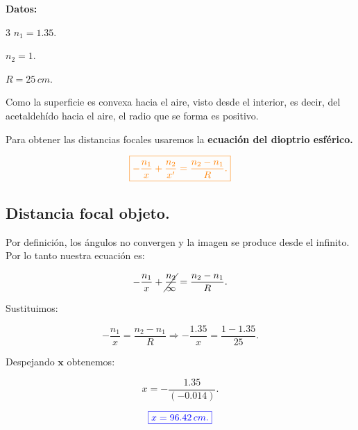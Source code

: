 \documentclass[a4paper,12pt]{article} %
\begin{document}
\vspace{\baselineskip}

\begin{justify}
	\textbf{Datos:}
\end{justify}

\begin{multicols}{3}
	\(n_1 = 1.35.\)

	\(n_2 = 1.\)

	\(R = 25 \, cm.  \)
\end{multicols}

\begin{justify}
	Como la superficie es convexa hacia el aire, visto desde el interior, es decir, del acetaldehído hacia el aire, el radio que se forma 
	es positivo.
\end{justify}

\begin{justify}
	Para obtener las distancias focales usaremos la \textbf{ecuación del dioptrio esférico.}
\end{justify}

\[ \textcolor{orange}{\boxed{ - \frac{n_1}{x} + \frac{n_2}{x'} = \frac{n_2 - n_1}{R}.}} \]

\subsection{Distancia focal objeto.}

\begin{justify}
	Por definición, los ángulos no convergen y la imagen se produce desde el infinito. Por lo tanto nuestra ecuación es:
\end{justify}

\[ -\frac{n_1}{x} + \cancel{\frac{n_2}{\infty}} = \frac{n_2 - n_1}{R}. \]

\begin{justify}
	Sustituimos:
\end{justify}

\[ -\frac{n_1}{x} = \frac{n_2 - n_1}{R} \Rightarrow -\frac{1.35}{x} = \frac{1 - 1.35}{25}. \]

\begin{justify}
	Despejando \(\mathbf{x}\) obtenemos:
\end{justify}

\[ x = -\frac{1.35}{\left(-0.014\right)}. \]

\vspace{\baselineskip}

\[\textcolor{blue}{\boxed{x = 96.42 \, cm.}}\]
\end{document}
